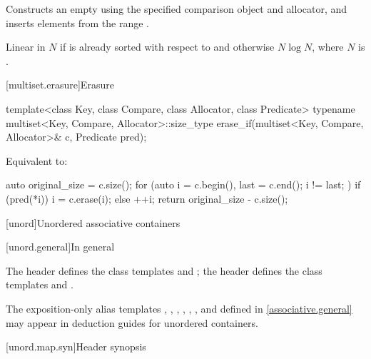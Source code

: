 \begin{itemdescr}
\pnum
\effects
Constructs an empty 
using the specified comparison object and allocator, and
inserts elements from the range .

\pnum
\complexity
Linear in $N$ if  is already sorted with respect to  and
otherwise $N \log N$, where $N$ is .
\end{itemdescr}

[multiset.erasure]{Erasure}

%
\begin{itemdecl}
template<class Key, class Compare, class Allocator, class Predicate>
  typename multiset<Key, Compare, Allocator>::size_type
    erase_if(multiset<Key, Compare, Allocator>& c, Predicate pred);
\end{itemdecl}

\begin{itemdescr}
\pnum
\effects
Equivalent to:
\begin{codeblock}
auto original_size = c.size();
for (auto i = c.begin(), last = c.end(); i != last; ) {
  if (pred(*i)) {
    i = c.erase(i);
  } else {
    ++i;
  }
}
return original_size - c.size();
\end{codeblock}
\end{itemdescr}

[unord]{Unordered associative containers}

[unord.general]{In general}

\pnum
The header  defines the class templates
 and
; the header  defines the class templates
 and .

\pnum
The exposition-only alias templates
, ,
, ,
, ,
and 
defined in \ref{associative.general} may appear in deduction guides for unordered containers.

[unord.map.syn]{Header  synopsis}

